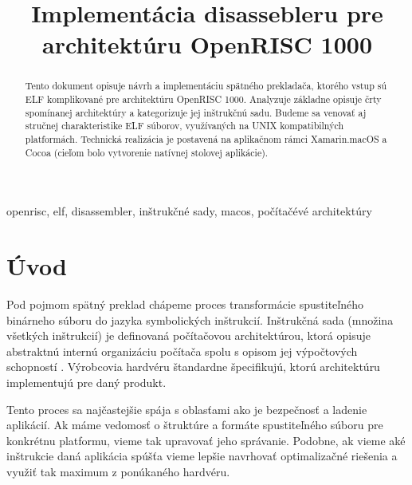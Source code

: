\documentclass[conference]{IEEEtran}
\begin{document}
\title{Implementácia disassebleru pre architektúru OpenRISC 1000}

\author{
}

\maketitle

\begin{abstract}
Tento dokument opisuje návrh a implementáciu spätného prekladača, ktorého vstup sú ELF komplikované pre architektúru OpenRISC 1000. Analyzuje základne opisuje črty spomínanej architektúry a kategorizuje jej inštrukčnú sadu. Budeme sa venovať aj stručnej charakteristike ELF súborov, využívaných na UNIX kompatibilných platformách. Technická realizácia je postavená na aplikačnom rámci Xamarin.macOS a Cocoa (cieľom bolo vytvorenie natívnej stolovej aplikácie).
\end{abstract}

\begin{IEEEkeywords}
openrisc, elf, disassembler, inštrukčné sady, macos, počítačévé architektúry
\end{IEEEkeywords}

\section{Úvod}
Pod pojmom spätný preklad chápeme proces transformácie spustiteľného binárneho súboru do jazyka symbolických inštrukcií. Inštrukčná sada (množina všetkých inštrukcií) je definovaná  počítačovou architektúrou, ktorá opisuje abstraktnú internú organizáciu počítača spolu s opisom jej výpočtových schopností \cite{clements2006principles}. Výrobcovia hardvéru štandardne špecifikujú, ktorú architektúru implementujú pre daný produkt.

Tento proces sa najčastejšie spája s oblasťami ako je bezpečnosť a ladenie aplikácií. Ak máme vedomosť o štruktúre a formáte spustiteľného súboru pre konkrétnu platformu, vieme tak upravovať jeho správanie. Podobne, ak vieme aké inštrukcie daná aplikácia spúšťa vieme lepšie navrhovať optimalizačné riešenia a využiť tak maximum z ponúkaného hardvéru.
\end{document}
